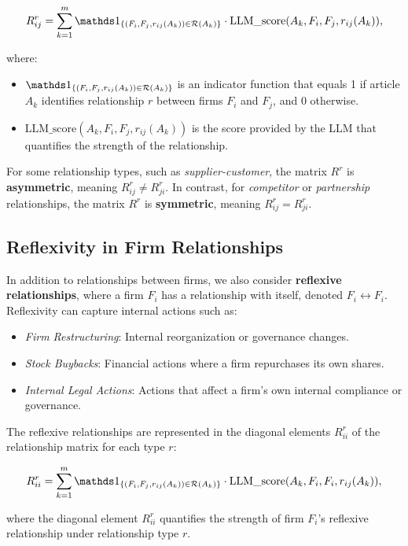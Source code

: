 $$
R^r_{ij} = \sum_{k=1}^{m} 
\I{(F_i, F_j, r_{ij}(A_k)) \in \mathcal{R}(A_k)} 
\cdot
\text{LLM\_score}(A_k, F_i, F_j, r_{ij}(A_k)),
$$

where:
\begin{itemize}
    \item $\I{(F_i, F_j, r_{ij}(A_k)) \in \mathcal{R}(A_k)}$ is an indicator function that equals 1 if article $ A_k $ identifies relationship $ r $ between firms $ F_i $ and $ F_j $, and 0 otherwise.
    \item $ \text{LLM\_score}(A_k, F_i, F_j, r_{ij}(A_k)) $ is the score provided by the LLM that quantifies the strength of the relationship.
\end{itemize}

For some relationship types, such as \textit{supplier-customer}, the matrix $ R^r $ is \textbf{asymmetric}, meaning $ R^r_{ij} \neq R^r_{ji} $. In contrast, for \textit{competitor} or \textit{partnership} relationships, the matrix $ R^r $ is \textbf{symmetric}, meaning $ R^r_{ij} = R^r_{ji} $.

\subsection{Reflexivity in Firm Relationships}

In addition to relationships between firms, we also consider \textbf{reflexive relationships}, where a firm $ F_i $ has a relationship with itself, denoted $ F_i \leftrightarrow F_i $. Reflexivity can capture internal actions such as:
\begin{itemize}
    \item \textit{Firm Restructuring}: Internal reorganization or governance changes.
    \item \textit{Stock Buybacks}: Financial actions where a firm repurchases its own shares.
    \item \textit{Internal Legal Actions}: Actions that affect a firm's own internal compliance or governance.
\end{itemize}

The reflexive relationships are represented in the diagonal elements $ R^r_{ii} $ of the relationship matrix for each type $ r $:

$$
R^r_{ii} = \sum_{k=1}^{m} 
\I{(F_i, F_j, r_{ij}(A_k)) \in \mathcal{R}(A_k)}
\cdot \text{LLM\_score}(A_k, F_i, F_i, r_{ij}(A_k)),
$$

where the diagonal element $ R^r_{ii} $ quantifies the strength of firm $ F_i $'s reflexive relationship under relationship type $r$.

